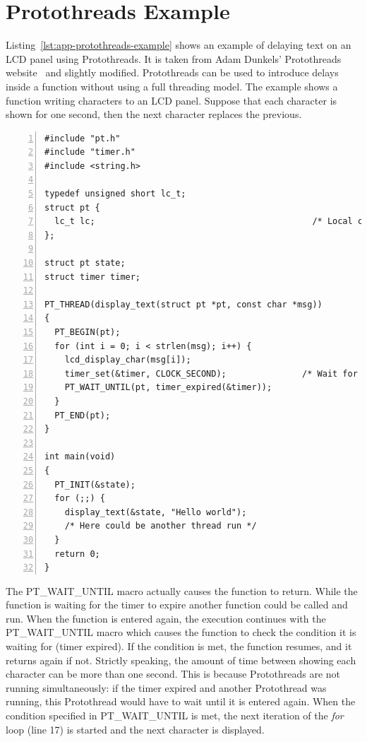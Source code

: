 
\chapter{Protothreads Example}\label{app:protothreads}
Listing~\ref{lst:app-protothreads-example} shows
an example of delaying text on an LCD panel using Protothreads.
It is taken from
Adam Dunkels' Protothreads website~\cite{adam-protothreads} and slightly modified.
Protothreads can be used to introduce delays inside a function without using a full threading model.
The example shows a function writing characters to an LCD panel.
Suppose that each character is shown for one second, then the next character replaces the previous.
\begin{lstlisting}[numbers=left,caption={Example using Protothreads},label=lst:app-protothreads-example]
#include "pt.h"
#include "timer.h"
#include <string.h>

typedef unsigned short lc_t;
struct pt {
  lc_t lc;                                           /* Local continuation */
};

struct pt state;
struct timer timer;

PT_THREAD(display_text(struct pt *pt, const char *msg))
{
  PT_BEGIN(pt);
  for (int i = 0; i < strlen(msg); i++) {
    lcd_display_char(msg[i]);
    timer_set(&timer, CLOCK_SECOND);               /* Wait for one second. */
    PT_WAIT_UNTIL(pt, timer_expired(&timer));
  }
  PT_END(pt);
}

int main(void)
{
  PT_INIT(&state);
  for (;;) {
    display_text(&state, "Hello world");
    /* Here could be another thread run */
  }
  return 0;
}
\end{lstlisting}
The PT\_WAIT\_UNTIL macro actually causes the function to return.
While the function is waiting for the timer to expire another function could be called and run.
When the function is entered again, the execution continues with the PT\_WAIT\_UNTIL macro
which causes the function to check the condition it is waiting for (timer expired).
If the condition is met, the function resumes, and it returns again if not.
Strictly speaking, the amount of time between showing each character can
be more than one second.
This is because Protothreads are not running simultaneously: if the timer expired
and another Protothread was running, this Protothread would have to wait until
it is entered again.
When the condition specified in PT\_WAIT\_UNTIL is met,
the next iteration of the {\it{for}} loop (line 17) is started and the next character is displayed.

